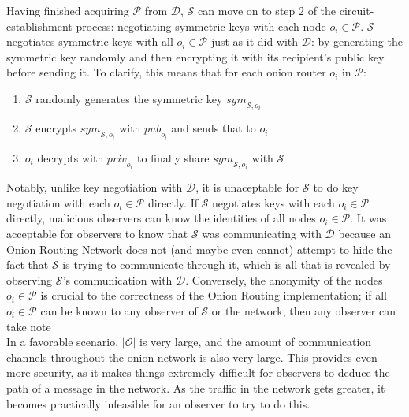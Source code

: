 \documentclass[10pt]{report}
\begin{document}
Having finished acquiring $\mathcal{P}$ from $\mathcal{D}$, $\mathcal{S}$ can move on to step 2 of the
circuit-establishment process: negotiating symmetric keys with each node $o_i \in \mathcal{P}$.
$\mathcal{S}$ negotiates symmetric keys with all $o_i \in \mathcal{P}$ just as it did with $\mathcal{D}$:
by generating the symmetric key randomly and then encrypting it with its recipient's public key before
sending it.  To clarify, this means that for each onion router $o_i$ in $\mathcal{P}$:
\begin{enumerate}
    \item $\mathcal{S}$ randomly generates the symmetric key $\mathit{sym}_{\mathcal{S},o_i}$
    \item $\mathcal{S}$ encrypts $\mathit{sym}_{\mathcal{S},o_i}$ with $\mathit{pub}_{o_i}$ and
        sends that to $o_i$
    \item $o_i$ decrypts with $\mathit{priv}_{o_i}$ to finally share $\mathit{sym}_{\mathcal{S},o_i}$ with
        $\mathcal{S}$
\end{enumerate}
Notably, unlike key negotiation with $\mathcal{D}$, it is unaceptable for $\mathcal{S}$ to do key negotiation
with each $o_i \in \mathcal{P}$ directly.  If $\mathcal{S}$ negotiates keys with each $o_i \in \mathcal{P}$
directly, malicious observers can know the identities of all nodes $o_i \in \mathcal{P}$.  It was acceptable
for observers to know that $\mathcal{S}$ was communicating with $\mathcal{D}$ because an Onion Routing
Network does not (and maybe even cannot) attempt to hide the fact that $\mathcal{S}$ is trying to
communicate through it, which is all that is revealed by observing $\mathcal{S}$'s communication with
$\mathcal{D}$.  Conversely, the anonymity of the nodes $o_i \in \mathcal{P}$ is crucial to the correctness
of the Onion Routing implementation; if all $o_i \in \mathcal{P}$ can be known to any observer of
$\mathcal{S}$ or the network, then any observer can take note \\

In a favorable scenario, $|\mathcal{O}|$ is very large, and the amount of communication channels
throughout the onion network is also very large. This provides even more security, as it makes
things extremely difficult for observers to deduce the path of a message in the network. As the
traffic in the network gets greater, it becomes practically infeasible for an observer to try to do
this.\\
\end{document}
